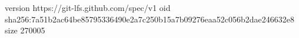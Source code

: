 version https://git-lfs.github.com/spec/v1
oid sha256:7a51b2ac64be85795336490e2a7c250b15a7b09276eaa52c056b2dae246632e8
size 270005
